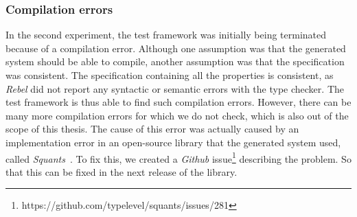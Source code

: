 \subsubsection{Compilation errors}
In the second experiment, the test framework was initially being terminated because of a
compilation error. Although one assumption was that the generated system should
be able to compile, another assumption was that the specification was
consistent. The specification containing all the properties is consistent,
as \textit{Rebel} did not report any syntactic or semantic errors with the type
checker. The test framework is thus able to find such compilation errors. However,
there can be many more compilation errors for which we do not check, which is
also out of the scope of this thesis. The cause of this error was actually
caused by an implementation error in an open-source library that the generated
system used, called \textit{Squants}~\cite{siteSquants2017}. To fix this, we
created a \textit{Github}
issue\footnote{https://github.com/typelevel/squants/issues/281} describing the
problem. So that this can be fixed in the next release of the library.

